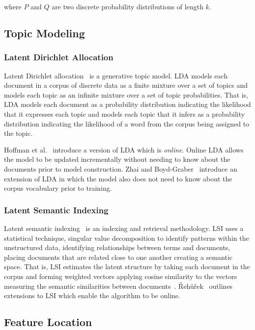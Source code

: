 where $P$ and $Q$ are two discrete probability distributions of length $k$.


\subsection{Topic Modeling}

\subsubsection{Latent Dirichlet Allocation}

Latent Dirichlet allocation~\cite{Blei-etal:2003} is a generative topic model.
LDA models each document in a corpus of discrete data as a finite mixture over
a set of topics and models each topic as an infinite mixture over a set of
topic probabilities.  That is, LDA models each document as a probability
distribution indicating the likelihood that it expresses each topic and models
each topic that it infers as a probability distribution indicating the
likelihood of a word from the corpus being assigned to the topic.

Hoffman et al.~\cite{Hoffman-etal:2010} introduce a version of LDA which is
\emph{online}.
Online LDA allows the model to be updated incrementally without needing
to know about the documents prior to model construction.
Zhai and Boyd-Graber~\cite{Zhai-Boyd-Graber:2013} introduce an extension of LDA
in which the model also does not need to know about the corpus vocabulary prior to training.

\subsubsection{Latent Semantic Indexing}

Latent semantic indexing~\cite{Deerwester-etal:1990} is an indexing and
retrieval methodology. LSI uses a statistical technique, singular value
decomposition to identify patterns within the unstructured data, identifying
relationships between terms and documents, placing documents that are related
close to one another creating a semantic space. That is, LSI estimates the
latent structure by taking each document in the corpus and forming weighted
vectors applying cosine similarity to the vectors measuring the semantic
similarities between documents~\cite{Binkley-Lawrie:2010}.
{\v R}eh{\r u}{\v r}ek~\cite{Radim:2011} outlines extensions to LSI
which enable the algorithm to be online.


\subsection{Feature Location}

